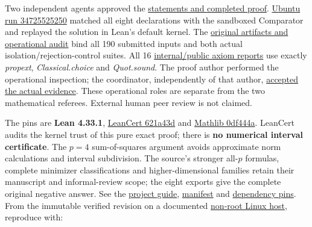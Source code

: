 \documentclass[11pt,a4paper]{article}
\begin{document}
Two independent agents approved the
\href{https://github.com/ajt60gaibb/OpenProblemsInNLA/blob/main/linear-systems-and-elimination/IE-23/lean/reviews}{statements
and completed proof}.
\href{https://github.com/sgstepaniants/OpenProblemsInNLA/actions/runs/34725525250}{Ubuntu
run 34725525250} matched all eight declarations with the sandboxed
Comparator and replayed the solution in Lean's default kernel. The
\href{https://github.com/ajt60gaibb/OpenProblemsInNLA/blob/main/linear-systems-and-elimination/IE-23/lean/verification/linux-2026-09-12}{original
artifacts and operational audit} bind all 190 submitted inputs and both
actual isolation/rejection-control suites. All 16
\href{https://github.com/ajt60gaibb/OpenProblemsInNLA/blob/main/linear-systems-and-elimination/IE-23/lean/verification/linux-2026-09-12/axiom-verification.json}{internal/public
axiom reports} use exactly \textit{propext}, \textit{Classical.choice}
and \textit{Quot.sound}. The proof author performed the operational
inspection; the coordinator, independently of that author,
\href{https://github.com/ajt60gaibb/OpenProblemsInNLA/blob/main/linear-systems-and-elimination/IE-23/lean/verification/root-operational-2026-09-12/ROOT-CHECKS.json}{accepted
the actual evidence}. These operational roles are separate from the two
mathematical referees. External human peer review is not claimed.

The pins are \textbf{Lean 4.33.1},
\href{https://github.com/alerad/leancert/tree/621a43d7cf21f87872392a01e874f2f1dbddc926}{LeanCert
621a43d} and
\href{https://github.com/leanprover-community/mathlib4/tree/0df444a360eaa60ab8c11dca51a86af692955474}{Mathlib
0df444a}. LeanCert audits the kernel trust of this pure exact proof;
there is \textbf{no numerical interval certificate}. The \(p=4\)
sum-of-squares argument avoids approximate norm calculations and
interval subdivision. The source's stronger all-\(p\) formulas, complete
minimizer classifications and higher-dimensional families retain their
manuscript and informal-review scope; the eight exports give the
complete original negative answer. See the
\href{https://github.com/ajt60gaibb/OpenProblemsInNLA/blob/main/linear-systems-and-elimination/IE-23/lean/README.md}{project
guide},
\href{https://github.com/ajt60gaibb/OpenProblemsInNLA/blob/main/linear-systems-and-elimination/IE-23/lean/formalization.yaml}{manifest}
and
\href{https://github.com/ajt60gaibb/OpenProblemsInNLA/blob/main/linear-systems-and-elimination/IE-23/lean/lake-manifest.json}{dependency
pins}. From the immutable verified revision on a documented
\href{https://github.com/ajt60gaibb/OpenProblemsInNLA/blob/main/tools/lean/HARNESS.md}{non-root
Linux host}, reproduce with:
\end{document}
